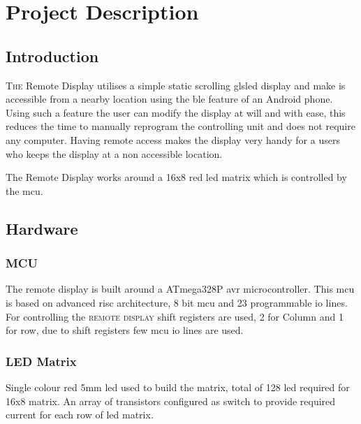 \vspace*{8.5cm}

\section{Project Description}

\begin{multicols}{2}

		\subsection{Introduction}

			\lettrine{T}{he} Remote Display utilises a simple static scrolling gls{led} display and make is accessible from a nearby location using the \gls{ble} feature of an Android phone. Using such a feature the user can modify the display at will and with ease, this reduces the time to manually reprogram the controlling unit and does not require any computer. Having remote access makes the display very handy for a users who keeps the display at a non accessible location. 
			
			The Remote Display works around a 16x8 red \gls{led} matrix which is controlled by the \gls{mcu}.
			
		\subsection{Hardware}
			\subsubsection{MCU}
				The remote display is built around a ATmega328P \gls{avr} microcontroller. This \gls{mcu} is based on advanced \gls{risc} \cite{AtMega328P} architecture, 8 bit \gls{mcu} and 23 programmable \gls{io} lines. For controlling the \textsc{remote display} shift registers are used, 2 for Column and 1 for row, due to shift registers few \gls{mcu} \gls{io} lines are used.
			\subsubsection{LED Matrix}
				 Single colour  red 5mm \gls{led} used to build the matrix, total of 128 \gls{led} required for 16x8 matrix. An array of transistors configured as switch to provide required current for each row of \gls{led} matrix.  


\end{multicols}
